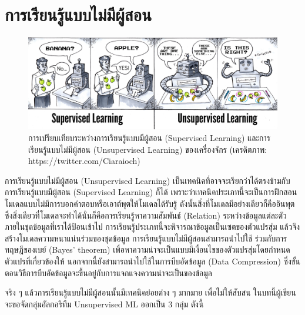 

\chapter{การเรียนรู้แบบไม่มีผู้สอน}
\label{ch:unsup_ml}

\begin{figure}[htbp]
    \centering
    \includegraphics[width=\linewidth]{fig/sup_vs_unsup_ml.jpeg}
    \caption{การเปรียบเทียบระหว่างการเรียนรู้แบบมีผู้สอน (Supervised Learning) และการเรียนรู้แบบไม่มีผู้สอน (Unsupervised 
    Learning) ของเครื่องจักร (เครดิตภาพ: https://twitter.com/Ciaraioch)}
    \label{fig:sup_vs_unsup_ml}
\end{figure}

การเรียนรู้แบบไม่มีผู้สอน (Unsupervised Learning) เป็นเทคนิคที่อาจจะเรียกว่าได้ตรงข้ามกับการเรียนรู้แบบมีผู้สอน (Supervised Learning) 
ก็ได้ เพราะว่าเทคนิคประเภทนี้จะเป็นการฝึกสอนโมเดลแบบไม่มีการบอกคำตอบหรือเอาต์พุตให้โมเดลได้รับรู้ ดังนั้นสิ่งที่โมเดลมีอย่างเดียวก็คืออินพุต
ซึ่งสิ่งเดียวที่โมเดลจะทำได้นั่นก็คือการเรียนรู้หาความสัมพันธ์ (Relation) ระหว่างข้อมูลแต่ละตัวภายในชุดข้อมูลที่เราได้ป้อนเข้าไป 
การเรียนรู้ประเภทนี้จะพิจารณาข้อมูลเป็นเซตของตัวแปรสุ่ม แล้วจึงสร้างโมเดลความหนาแน่นร่วมของชุดข้อมูล การเรียนรู้แบบไม่มีผู้สอนสามารถนำไปใช้%
ร่วมกับการทฤษฎีของเบย์ (Bayes' theorem) เพื่อหาความน่าจะเป็นแบบมีเงื่อนไขของตัวแปรสุ่มโดยกำหนดตัวแปรที่เกี่ยวข้องให้ 
นอกจากนี้ยังสามารถนำไปใช้ในการบีบอัดข้อมูล (Data Compression) ซึ่งขั้นตอนวิธีการบีบอัดข้อมูลจะขึ้นอยู่กับการแจกแจงความน่าจะเป็นของข้อมูล

จริง ๆ แล้วการเรียนรู้แบบไม่มีผู้สอนนั้นมีเทคนิคย่อยต่าง ๆ มากมาย เพื่อไม่ให้สับสน ในบทนี้ผู้เขียนจะขอจัดกลุ่มอัลกอริทึม Unsupervised ML 
ออกเป็น 3 กลุ่ม ดังนี้

